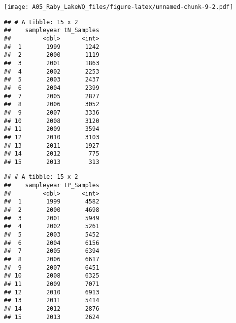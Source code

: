 \documentclass[]{article}
\newenvironment{Shaded}{\begin{snugshade}}{\end{snugshade}}
\newcommand{\DataTypeTok}[1]{\textcolor[rgb]{0.13,0.29,0.53}{#1}}
\newcommand{\DecValTok}[1]{\textcolor[rgb]{0.00,0.00,0.81}{#1}}
\newcommand{\KeywordTok}[1]{\textcolor[rgb]{0.13,0.29,0.53}{\textbf{#1}}}
\newcommand{\NormalTok}[1]{#1}
\newcommand{\OperatorTok}[1]{\textcolor[rgb]{0.81,0.36,0.00}{\textbf{#1}}}
\newcommand{\StringTok}[1]{\textcolor[rgb]{0.31,0.60,0.02}{#1}}
\begin{document}
\texttt{[image: A05\_Raby\_LakeWQ\_files/figure-latex/unnamed-chunk-9-2.pdf]}

\begin{Shaded}
\end{Shaded}

\begin{verbatim}
## # A tibble: 15 x 2
##    sampleyear tN_Samples
##         <dbl>      <int>
##  1       1999       1242
##  2       2000       1119
##  3       2001       1863
##  4       2002       2253
##  5       2003       2437
##  6       2004       2399
##  7       2005       2877
##  8       2006       3052
##  9       2007       3336
## 10       2008       3120
## 11       2009       3594
## 12       2010       3103
## 13       2011       1927
## 14       2012        775
## 15       2013        313
\end{verbatim}

\begin{Shaded}
\end{Shaded}

\begin{verbatim}
## # A tibble: 15 x 2
##    sampleyear tP_Samples
##         <dbl>      <int>
##  1       1999       4582
##  2       2000       4698
##  3       2001       5949
##  4       2002       5261
##  5       2003       5452
##  6       2004       6156
##  7       2005       6394
##  8       2006       6617
##  9       2007       6451
## 10       2008       6325
## 11       2009       7071
## 12       2010       6913
## 13       2011       5414
## 14       2012       2876
## 15       2013       2624
\end{verbatim}
\end{document}
